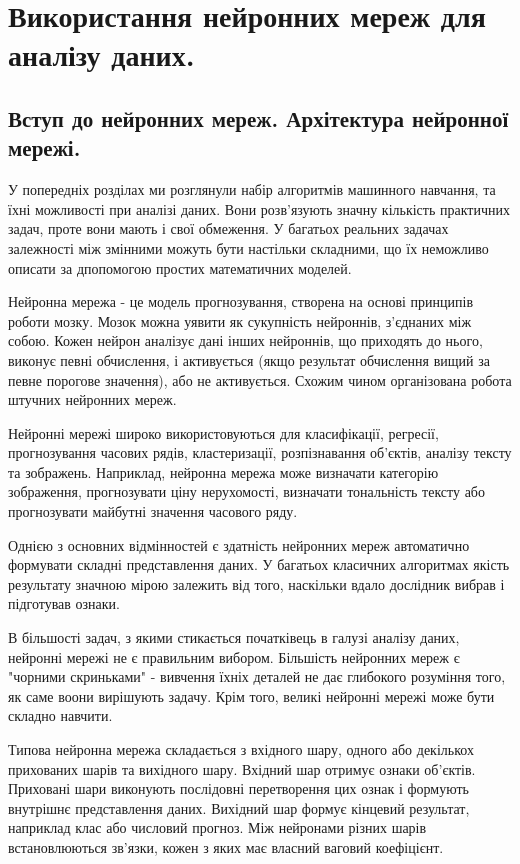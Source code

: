 \chapter{Використання нейронних мереж для аналізу даних.}


\section{Вступ до нейронних мереж. Архітектура нейронної мережі.}

У попередніх розділах ми розглянули набір алгоритмів машинного навчання, та їхні можливості при аналізі даних. Вони розв'язують значну кількість практичних задач, проте вони мають і свої обмеження. У багатьох реальних задачах залежності між змінними можуть бути настільки складними, що їх неможливо описати за дпопомогою простих математичних моделей.

Нейронна мережа - це модель прогнозування, створена на основі принципів роботи мозку. Мозок можна уявити як сукупність нейроннів, з'єднаних між собою. Кожен нейрон аналізує дані інших нейроннів, що приходять до нього, виконує певні обчислення, і активується (якщо результат обчислення вищий за певне порогове значення), або не активується. Схожим чином організована робота штучних нейронних мереж.

Нейронні мережі широко використовуються для класифікації, регресії, прогнозування часових рядів, кластеризації, розпізнавання об'єктів, аналізу тексту та зображень. Наприклад, нейронна мережа може визначати категорію зображення, прогнозувати ціну нерухомості, визначати тональність тексту або прогнозувати майбутні значення часового ряду.

Однією з основних відмінностей є здатність нейронних мереж автоматично формувати складні представлення даних. У багатьох класичних алгоритмах якість результату значною мірою залежить від того, наскільки вдало дослідник вибрав і підготував ознаки.

 В більшості задач, з якими стикається початківець в галузі аналізу даних, нейронні мережі не є правильним вибором. Більшість нейронних мереж є "чорними скриньками" - вивчення їхніх деталей не дає глибокого розуміння того, як саме воони вирішують задачу. Крім того, великі нейронні мережі може бути складно навчити.

Типова нейронна мережа складається з вхідного шару, одного або декількох прихованих шарів та вихідного шару. Вхідний шар отримує ознаки об'єктів. Приховані шари виконують послідовні перетворення цих ознак і формують внутрішнє представлення даних. Вихідний шар формує кінцевий результат, наприклад клас або числовий прогноз. Між нейронами різних шарів встановлюються зв'язки, кожен з яких має власний ваговий коефіцієнт.

